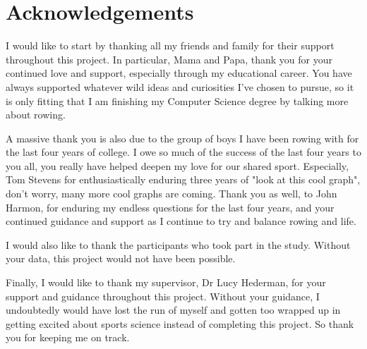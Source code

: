 \newpage
\onehalfspacing\raggedright %

\section*{\Huge{Acknowledgements}}
I would like to start by thanking all my friends and family for their support throughout this project. In particular, Mama and Papa, thank you for your continued love and support, especially through my educational career. You have always supported whatever wild ideas and curiosities I've chosen to pursue, so it is only fitting that I am finishing my Computer Science degree by talking more about rowing. 

A massive thank you is also due to the group of boys I have been rowing with for the last four years of college. I owe so much of the success of the last four years to you all, you really have helped deepen my love for our shared sport. Especially, Tom Stevens for enthusiastically enduring three years of "look at this cool graph", don't worry, many more cool graphs are coming. Thank you as well, to John Harmon, for enduring my endless questions for the last four years, and your continued guidance and support as I continue to try and balance rowing and life.

I would also like to thank the participants who took part in the study. Without your data, this project would not have been possible. 

Finally, I would like to thank my supervisor, Dr Lucy Hederman, for your support and guidance throughout this project. Without your guidance, I undoubtedly would have lost the run of myself and gotten too wrapped up in getting excited about sports science instead of completing this project. So thank you for keeping me on track. 
